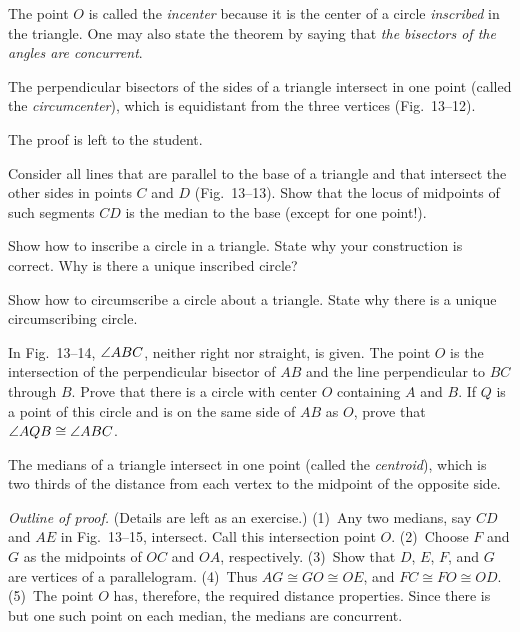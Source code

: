 \documentclass[11pt]{book}
\begin{document}
The point $O$ is called the \emph{incenter} because it is the center of a circle
\emph{inscribed} in the triangle. One may also state the theorem by saying that
\emph{the bisectors of the angles are concurrent}.

\FIGXIIITWELVE

\begin{theorem}
The perpendicular bisectors of the sides of a triangle intersect in one point
(called the \emph{circumcenter}), which is equidistant from the three vertices
(Fig.~13--12).
\end{theorem}

The proof is left to the student.


\begin{exercisecols}
\begin{exlist}
\item Consider all lines that are parallel to the base of a triangle and that
      intersect the other sides in points $C$ and $D$ (Fig.~13--13). Show that
      the locus of midpoints of such segments $CD$ is the median to the base
      (except for one point!).
\exfig{\FIGXIIITHIRTEEN}
\item Show how to inscribe a circle in a triangle. State why your construction
      is correct. Why is there a unique inscribed circle?
\item Show how to circumscribe a circle about a triangle. State why there is a
      unique circumscribing circle.
\item In Fig.~13--14, $\angle ABC$, neither right nor straight, is given. The
      point $O$ is the intersection of the perpendicular bisector of $AB$ and
      the line perpendicular to $BC$ through $B$. Prove that there is a circle
      with center $O$ containing $A$ and $B$. If $Q$ is a point of this circle
      and is on the same side of $AB$ as $O$, prove that
      $\angle AQB \cong \angle ABC$.
\exfig{\FIGXIIIFOURTEEN}
\end{exlist}
\end{exercisecols}

\begin{theorem}
The medians of a triangle intersect in one point (called the \emph{centroid}),
which is two thirds of the distance from each vertex to the midpoint of the
opposite side.
\end{theorem}

\noindent\emph{Outline of proof.} (Details are left as an exercise.) (1)~Any two
medians, say $CD$ and $AE$ in Fig.~13--15, intersect. Call this intersection
point $O$. (2)~Choose $F$ and $G$ as the midpoints of $OC$ and $OA$,
respectively. (3)~Show that $D$, $E$, $F$, and $G$ are vertices of a
parallelogram. (4)~Thus $AG \cong GO \cong OE$, and $FC \cong FO \cong OD$.
(5)~The point $O$ has, therefore, the required distance properties. Since there
is but one such point on each median, the medians are concurrent.
\end{document}
